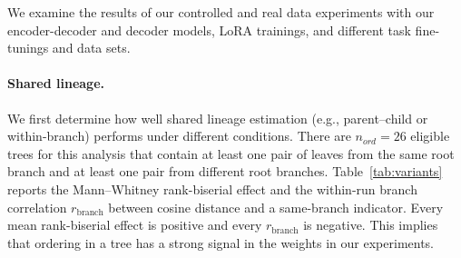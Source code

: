\documentclass{article}
\theoremstyle{definition}
\theoremstyle{plain}
\begin{document}

We examine the results of our controlled and real data experiments with our encoder-decoder and decoder models, LoRA trainings, and different task fine-tunings and data sets.


\paragraph{Shared lineage.}
We first determine how well shared lineage estimation (e.g., parent--child or within-branch) performs under different conditions. There are $n_{ord}=26$ eligible trees for this analysis that contain at least one pair of leaves from the same root branch and at least one pair from different root branches. Table~\ref{tab:variants} reports the Mann--Whitney rank-biserial effect and the within-run branch correlation $r_{\mathrm{branch}}$ between cosine distance and a same-branch indicator. Every mean rank-biserial effect is positive and every $r_{\mathrm{branch}}$ is negative. This implies that ordering in a tree has a strong signal in the weights in our experiments.
\end{document}
